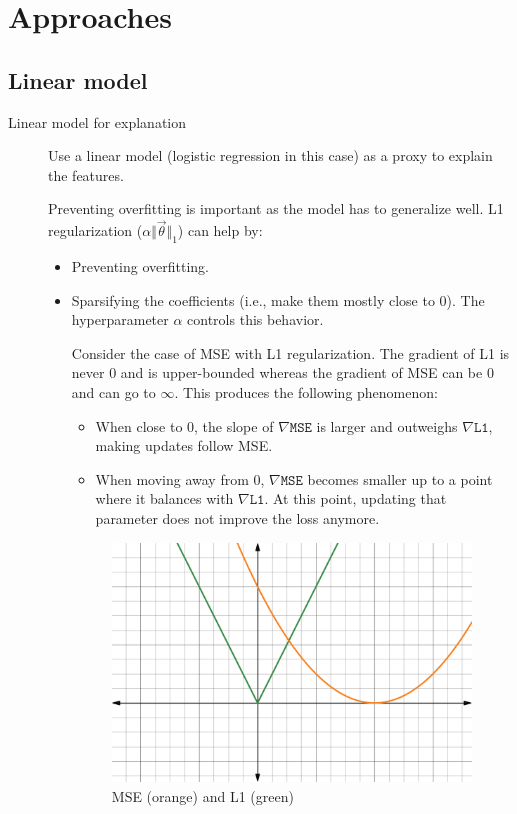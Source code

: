 \section{Approaches}


\subsection{Linear model}

\begin{description}
    \item[Linear model for explanation] 
        Use a linear model (logistic regression in this case) as a proxy to explain the features.

        \begin{remark}
            Preventing overfitting is important as the model has to generalize well. L1 regularization ($\alpha \Vert \vec{\theta} \Vert_1$) can help by:
            \begin{itemize}
                \item Preventing overfitting.
                \item Sparsifying the coefficients (i.e., make them mostly close to $0$). The hyperparameter $\alpha$ controls this behavior.
                    \begin{example}
                        Consider the case of MSE with L1 regularization.
                        The gradient of L1 is never $0$ and is upper-bounded whereas the gradient of MSE can be $0$ and can go to $\infty$. This produces the following phenomenon:
                        \begin{itemize}
                            \item When close to $0$, the slope of $\nabla\texttt{MSE}$ is larger and outweighs $\nabla\texttt{L1}$, making updates follow MSE.
                            \item When moving away from $0$, $\nabla\texttt{MSE}$ becomes smaller up to a point where it balances with $\nabla\texttt{L1}$. At this point, updating that parameter does not improve the loss anymore.
                        \end{itemize}

                        \begin{figure}[H]
                            \centering
                            \includegraphics[width=0.4\linewidth]{./img/mse_l1.png}
                            \caption{MSE (orange) and L1 (green)}
                        \end{figure}
                    \end{example}
            \end{itemize}
        \end{remark}


\end{description}

